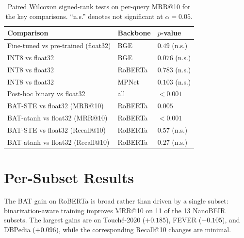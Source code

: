 \begin{table}[h]
  \centering
  \caption{Paired Wilcoxon signed-rank tests on per-query MRR@10 for the key
  comparisons. ``n.s.'' denotes not significant at $\alpha=0.05$.}
  \label{tab:sig}
  \begin{tabular}{lll}
    \toprule
    \textbf{Comparison} & \textbf{Backbone} & \textbf{$p$-value} \\
    \midrule
    Fine-tuned vs pre-trained (float32) & BGE     & $0.49$ (n.s.) \\
    INT8 vs float32                     & BGE     & $0.076$ (n.s.) \\
    INT8 vs float32                     & RoBERTa & $0.783$ (n.s.) \\
    INT8 vs float32                     & MPNet   & $0.103$ (n.s.) \\
    Post-hoc binary vs float32          & all     & $<0.001$ \\
    BAT-STE vs float32 (MRR@10)         & RoBERTa & $0.005$ \\
    BAT-atanh vs float32 (MRR@10)       & RoBERTa & $<0.001$ \\
    BAT-STE vs float32 (Recall@10)      & RoBERTa & $0.57$ (n.s.) \\
    BAT-atanh vs float32 (Recall@10)    & RoBERTa & $0.27$ (n.s.) \\
    \bottomrule
  \end{tabular}
\end{table}

\section{Per-Subset Results}
\label{app:persubset}
The BAT gain on RoBERTa is broad rather than driven by a single subset:
binarization-aware training improves MRR@10 on 11 of the 13 NanoBEIR subsets.
The largest gains are on Touch\'e-2020 ($+0.185$), FEVER ($+0.105$), and DBPedia
($+0.096$), while the corresponding Recall@10 changes are minimal.
